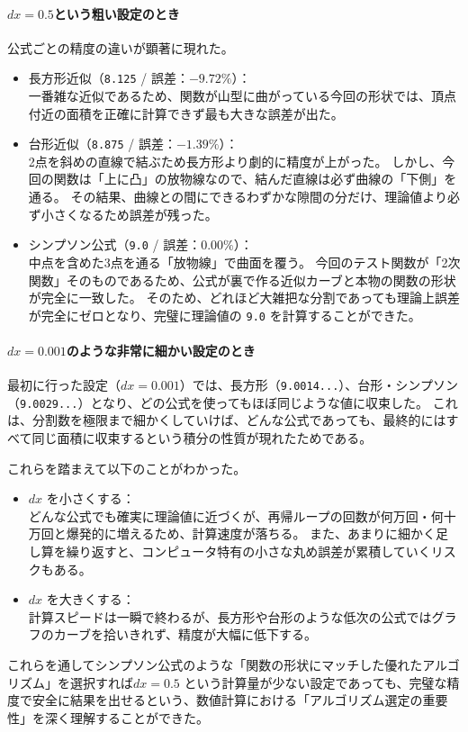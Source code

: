 \documentclass[titlepage]{ltjsarticle}
\begin{document}
\paragraph{$dx = 0.5$という粗い設定のとき}
\par
公式ごとの精度の違いが顕著に現れた。
\begin{itemize}
    \item 長方形近似（\texttt{8.125} / 誤差：$-9.72\%$）：\\
    一番雑な近似であるため、関数が山型に曲がっている今回の形状では、頂点付近の面積を正確に計算できず最も大きな誤差が出た。
    \par
    \item 台形近似（\texttt{8.875} / 誤差：$-1.39\%$）：\\
    2点を斜めの直線で結ぶため長方形より劇的に精度が上がった。
    しかし、今回の関数は「上に凸」の放物線なので、結んだ直線は必ず曲線の「下側」を通る。
    その結果、曲線との間にできるわずかな隙間の分だけ、理論値より必ず小さくなるため誤差が残った。
    \par
    \item シンプソン公式（\texttt{9.0} / 誤差：$0.00\%$）：\\
    中点を含めた3点を通る「放物線」で曲面を覆う。
    今回のテスト関数が「2次関数」そのものであるため、公式が裏で作る近似カーブと本物の関数の形状が完全に一致した。
    そのため、どれほど大雑把な分割であっても理論上誤差が完全にゼロとなり、完璧に理論値の \texttt{9.0} を計算することができた。
\end{itemize}

\paragraph{$dx = 0.001$のような非常に細かい設定のとき}
\par
最初に行った設定（$dx = 0.001$）では、長方形（\texttt{9.0014...}）、台形・シンプソン（\texttt{9.0029...}）となり、どの公式を使ってもほぼ同じような値に収束した。
これは、分割数を極限まで細かくしていけば、どんな公式であっても、最終的にはすべて同じ面積に収束するという積分の性質が現れたためである。

これらを踏まえて以下のことがわかった。
\begin{itemize}
    \item $dx$ を小さくする：\\
    どんな公式でも確実に理論値に近づくが、再帰ループの回数が何万回・何十万回と爆発的に増えるため、計算速度が落ちる。
    また、あまりに細かく足し算を繰り返すと、コンピュータ特有の小さな丸め誤差が累積していくリスクもある。
    \par
    \item $dx$ を大きくする：\\
    計算スピードは一瞬で終わるが、長方形や台形のような低次の公式ではグラフのカーブを拾いきれず、精度が大幅に低下する。
\end{itemize}
\par
これらを通してシンプソン公式のような「関数の形状にマッチした優れたアルゴリズム」を選択すれば$dx = 0.5$ という計算量が少ない設定であっても、完璧な精度で安全に結果を出せるという、数値計算における「アルゴリズム選定の重要性」を深く理解することができた。
\end{document}
